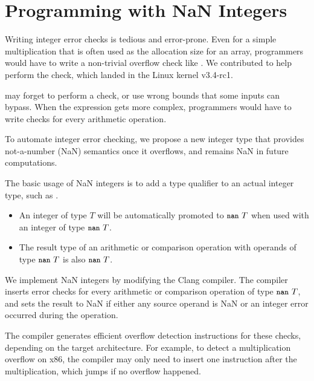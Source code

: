 \section{Programming with NaN Integers}
\label{s:miti}


Writing integer error checks is tedious and error-prone.
Even for a simple multiplication  that is often used
as the allocation size for an array, programmers would
have to write a non-trivial overflow check like .  We contributed 
to help perform the check, which landed in the Linux kernel v3.4-rc1.

may forget to perform a check, or use wrong bounds that some inputs
can bypass. 
When the expression gets more complex,
programmers would have to write checks for every arithmetic operation.

To automate integer error checking, we propose a new integer type that provides
not-a-number (NaN) semantics once it overflows, and remains NaN in future
computations.

The basic usage of NaN integers is to add a type qualifier 
to an actual integer type, such as .
\begin{itemize}
\item
An integer of type $T$ will be automatically promoted to $\cc{nan}\ T$
when used with an integer of type $\cc{nan}\ T$.
\item
The result type of an arithmetic or comparison operation with
operands of type $\cc{nan}\ T$ is also $\cc{nan}\ T$.
\end{itemize}
We implement NaN integers by modifying the Clang compiler.
The compiler inserts error checks for every arithmetic or
comparison operation of type $\cc{nan}\ T$, and sets the result to
NaN if either any source operand is NaN or an integer error occurred
during the operation.

The compiler generates efficient overflow detection instructions
for these checks, depending on the target architecture.  For example,
to detect a multiplication overflow on x86, the compiler may only
need to insert one  instruction after the multiplication,
which jumps if no overflow happened.

